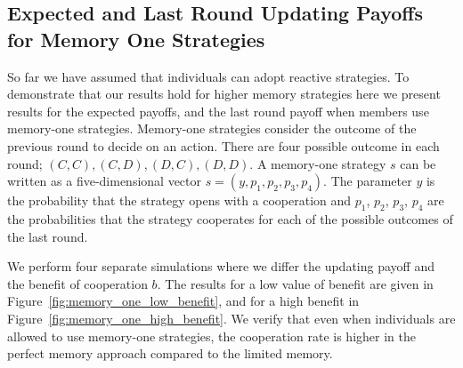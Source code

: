 \documentclass[11pt]{article}
\theoremstyle{plainCl1}
\theoremstyle{plainCl2}
\begin{document}
\subsection{Expected and Last Round Updating Payoffs for Memory One Strategies}\label{section:memory_one}

So far we have assumed that individuals can adopt reactive strategies.
To demonstrate that our results hold for higher memory strategies here we
present results for the expected payoffs, and the last round payoff when members
use memory-one strategies. Memory-one strategies consider the outcome of the
previous round to decide on an action. There are four possible outcome in each
round; \((C, C), (C, D), (D, C), (D, D)\). A memory-one strategy \(s\) can be
written as a five-dimensional vector \(s=(y, p_1, p_2, p_3, p_4)\). The
parameter \(y\) is the probability that the strategy opens with a cooperation
and \(p_1\), \(p_2\), \(p_3\), \(p_4\) are the probabilities that the strategy
cooperates for each of the possible outcomes of the last round.

We perform four separate simulations where we differ the updating payoff and the
benefit of cooperation \(b\). The results for a low value of benefit are given
in Figure~\ref{fig:memory_one_low_benefit}, and for a high benefit in
Figure~\ref{fig:memory_one_high_benefit}. We verify that even when individuals
are allowed to use memory-one strategies, the cooperation rate is higher
in the perfect memory approach compared to the limited memory.
\end{document}
